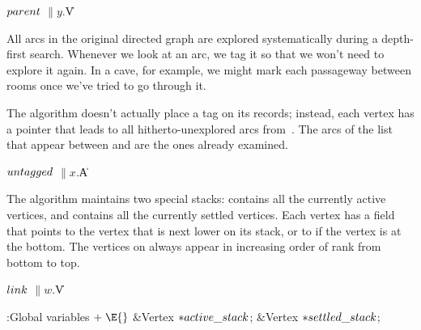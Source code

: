 \Y\B\4\D$\\{parent}$ \5
$\|y.{}$\|V\par
\fi

All arcs in the original directed graph are explored systematically during
a depth-first search. Whenever we look at an arc, we tag it so that
we won't need to explore it again. In a cave, for example, we might
mark each passageway between rooms once we've tried to go through it.

The algorithm doesn't actually place a tag on its  records;
instead,
each vertex  has a pointer  that leads to all
hitherto-unexplored arcs from~. The arcs of the list that appear
between  and  are the ones
already examined.

\Y\B\4\D$\\{untagged}$ \5
$\|x.{}$\|A\par
\fi

The algorithm maintains two special stacks: 
contains
all the currently active vertices, and  contains all the
currently settled vertices. Each vertex has a  field that points
to the vertex that is next lower on its stack, or to \PB{$\NULL$} if the vertex
is
at the bottom. The vertices on  always appear in
increasing
order of rank from bottom to top.

\Y\B\4\D$\\{link}$ \5
$\|w.{}$\|V\par
\Y\B\4:Global variables\X${}\mathrel+\E{}$\6
\&{Vertex} ${}{*}\\{active\_stack}{}$;\6
\&{Vertex} ${}{*}\\{settled\_stack}{}$;\par
\fi

